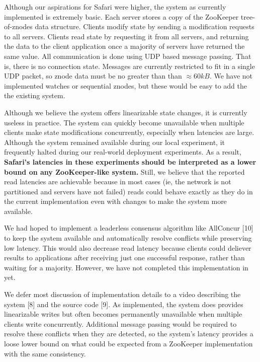 Although our aspirations for Safari were higher, the system as currently implemented is extremely
basic. Each server stores a copy of the ZooKeeper tree-of-znodes data structure. Clients modify
state by sending a modification requests to all servers. Clients read state by requesting it from
all servers, and returning the data to the client application once a majority of servers have
returned the same value. All communication is done using UDP based message passing. That is, there
is no connection state. Messages are currently restricted to fit in a single UDP packet, so znode
data must be no greater than than $\approx 60kB$. We have not implemented watches or sequential
znodes, but these would be easy to add the the existing system.

Although we believe the system offers linearizable state changes, it is currently useless in
practice. The system can quickly become unavailable when multiple clients make state modifications
concurrently, especially when latencies are large. Although the system remained available during our
local experiment, it frequently halted during our real-world deployment experiments. As a result,
\textbf{Safari's latencies in these experiments should be interpreted as a lower bound on any
ZooKeeper-like system.} Still, we believe that the reported read latencies are achievable because in
most cases (ie, the network is not partitioned and servers have not failed) reads could behave
exactly as they do in the current implementation even with changes to make the system more
available.

We had hoped to implement a leaderless consensus algorithm like AllConcur [10] to keep the system
available and automatically resolve conflicts while preserving low latency. This would also decrease
read latency because clients could deliever results to applications after receiving just one
successful response, rather than waiting for a majority. However, we have not completed this
implementation in yet.

We defer most discussion of implementation details to a video describing the system [8] and the source
code [9]. As implemented, the system does provides linearizable writes but often becomes permanently
unavailable when multiple clients write concurrently. Additional message passing would be required
to resolve these conflicts when they are detected, so the system's latency provides a loose lower
bound on what could be expected from a ZooKeeper implementation with the same consistency.

